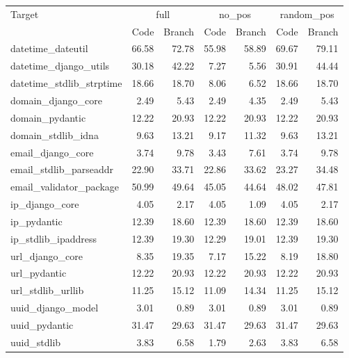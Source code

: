 \begin{tabular}{lrrrrrr}
\toprule
Target & \multicolumn{2}{c}{full} & \multicolumn{2}{c}{no\_pos} & \multicolumn{2}{c}{random\_pos} \\
 & Code & Branch & Code & Branch & Code & Branch \\
\midrule
datetime\_dateutil & 66.58 & 72.78 & 55.98 & 58.89 & 69.67 & 79.11 \\
datetime\_django\_utils & 30.18 & 42.22 & 7.27 & 5.56 & 30.91 & 44.44 \\
datetime\_stdlib\_strptime & 18.66 & 18.70 & 8.06 & 6.52 & 18.66 & 18.70 \\
domain\_django\_core & 2.49 & 5.43 & 2.49 & 4.35 & 2.49 & 5.43 \\
domain\_pydantic & 12.22 & 20.93 & 12.22 & 20.93 & 12.22 & 20.93 \\
domain\_stdlib\_idna & 9.63 & 13.21 & 9.17 & 11.32 & 9.63 & 13.21 \\
email\_django\_core & 3.74 & 9.78 & 3.43 & 7.61 & 3.74 & 9.78 \\
email\_stdlib\_parseaddr & 22.90 & 33.71 & 22.86 & 33.62 & 23.27 & 34.48 \\
email\_validator\_package & 50.99 & 49.64 & 45.05 & 44.64 & 48.02 & 47.81 \\
ip\_django\_core & 4.05 & 2.17 & 4.05 & 1.09 & 4.05 & 2.17 \\
ip\_pydantic & 12.39 & 18.60 & 12.39 & 18.60 & 12.39 & 18.60 \\
ip\_stdlib\_ipaddress & 12.39 & 19.30 & 12.29 & 19.01 & 12.39 & 19.30 \\
url\_django\_core & 8.35 & 19.35 & 7.17 & 15.22 & 8.19 & 18.80 \\
url\_pydantic & 12.22 & 20.93 & 12.22 & 20.93 & 12.22 & 20.93 \\
url\_stdlib\_urllib & 11.25 & 15.12 & 11.09 & 14.34 & 11.25 & 15.12 \\
uuid\_django\_model & 3.01 & 0.89 & 3.01 & 0.89 & 3.01 & 0.89 \\
uuid\_pydantic & 31.47 & 29.63 & 31.47 & 29.63 & 31.47 & 29.63 \\
uuid\_stdlib & 3.83 & 6.58 & 1.79 & 2.63 & 3.83 & 6.58 \\
\bottomrule
\end{tabular}
